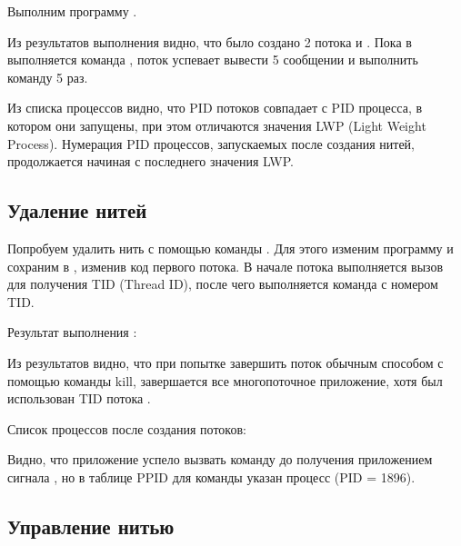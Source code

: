Выполним программу .



Из результатов выполнения видно, что было создано 2 потока  и . Пока в  выполняется команда , поток  успевает вывести 5 сообщении и выполнить команду  5 раз.







Из списка процессов видно, что PID потоков совпадает с PID процесса, в котором они запущены, при этом отличаются значения LWP (Light Weight Process). Нумерация PID процессов, запускаемых после создания нитей, продолжается начиная с последнего значения LWP.

\subsection{Удаление нитей}

Попробуем удалить нить с помощью команды . Для этого изменим программу  и сохраним в , изменив код первого потока. В начале потока выполняется вызов  для получения TID (Thread ID), после чего выполняется команда  с номером TID.



Результат выполнения :



Из результатов видно, что при попытке завершить поток обычным способом с помощью команды kill, завершается все многопоточное приложение, хотя был использован TID потока .

Список процессов после создания потоков:



Видно, что приложение успело вызвать команду  до получения приложением сигнала , но в таблице PPID для команды  указан процесс  (PID = 1896).

\subsection{Управление нитью}

